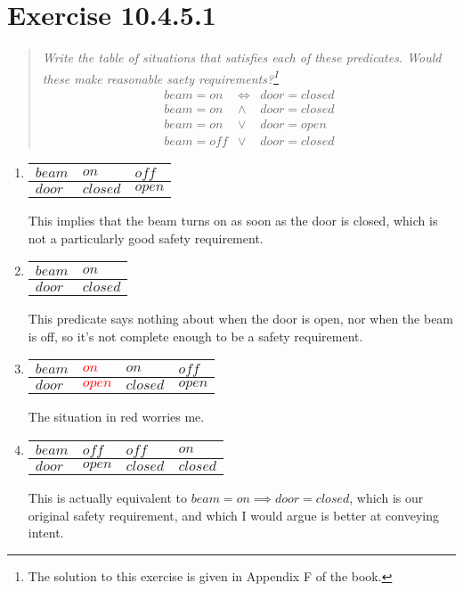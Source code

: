 \documentclass[10pt]{article}
\begin{document}
\section{Exercise 10.4.5.1}
\begin{quote}
  {\it Write the table of situations that satisfies each of these predicates.  Would these make
    reasonable saety requirements?\footnote{The solution to this exercise is given in Appendix F of
      the book.} }
    \begin{eqnarray}
      beam = on  & \iff  & door = closed \\
      beam = on  & \land & door = closed \\
      beam = on  & \lor  & door = open   \\
      beam = off & \lor  & door = closed
    \end{eqnarray}
\end{quote}
\begin{enumerate}
\item
  \begin{tabular}{l||l|l}
    $beam$ & $on$     & $off$ \\
    \hline
    $door$ & $closed$ & $open$
  \end{tabular}

  This implies that the beam turns on as soon as the door is closed, which is not a particularly
  good safety requirement.

\item
  \begin{tabular}{l||l}
    $beam$ & $on$ \\
    \hline
    $door$ & $closed$
  \end{tabular}

  This predicate says nothing about when the door is open, nor when the beam is off, so it's not
  complete enough to be a safety requirement.

\item
  \begin{tabular}{l||l|l|l}
    $beam$ & \textcolor{red}{$on$}   & $on$     & $off$ \\
    \hline
    $door$ & \textcolor{red}{$open$} & $closed$ & $open$
  \end{tabular}

  The situation in red worries me.

\item
  \begin{tabular}{l||l|l|l}
    $beam$ & $off$  & $off$    & $on$ \\
    \hline
    $door$ & $open$ & $closed$ & $closed$
  \end{tabular}

  This is actually equivalent to $beam=on \implies door=closed$, which is our original safety
  requirement, and which I would argue is better at conveying intent.
\end{enumerate}
\end{document}
